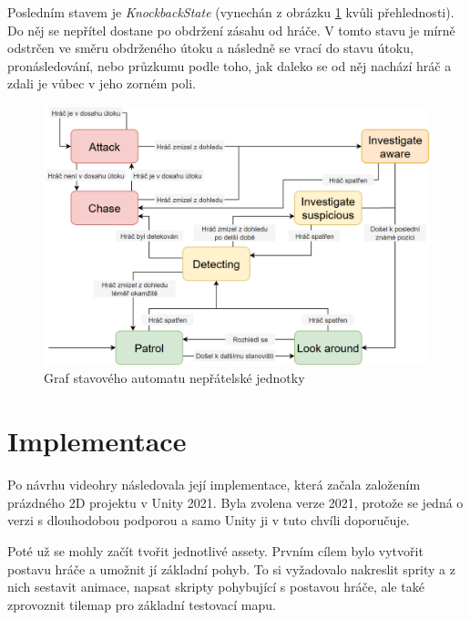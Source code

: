 \documentclass[FM,Proj]{tulthesis}
\begin{document}
	Posledním stavem je \textit{KnockbackState} (vynechán z obrázku \ref{imgFSM} kvůli přehlednosti). Do něj se nepřítel dostane po obdržení zásahu od hráče. V tomto stavu je mírně odstrčen ve směru obdrženého útoku a následně se vrací do stavu útoku, pronásledování, nebo průzkumu podle toho, jak daleko se od něj nachází hráč a zdali je vůbec v jeho zorném poli.
	
	\begin{figure}[ht]
		\centering
		\includegraphics[width=\textwidth]{img/FSM}
		\caption{Graf stavového automatu nepřátelské jednotky}
		\label{imgFSM}
	\end{figure}
	
	
	\chapter{Implementace}
	\label{chp4}
	
	Po návrhu videohry následovala její implementace, která začala založením prázdného 2D projektu v Unity 2021. Byla zvolena verze 2021, protože se jedná o verzi s dlouhodobou podporou a samo Unity ji v tuto chvíli doporučuje.
	
	Poté už se mohly začít tvořit jednotlivé assety. Prvním cílem bylo vytvořit postavu hráče a umožnit jí základní pohyb. To si vyžadovalo nakreslit sprity a z nich sestavit animace, napsat skripty pohybující s postavou hráče, ale také zprovoznit tilemap pro základní testovací mapu.
	
\end{document}
